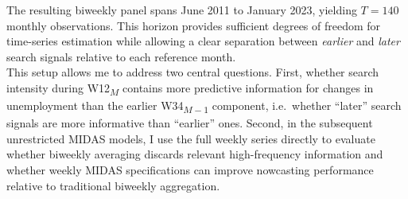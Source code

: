 \documentclass[12pt,a4paper]{article}
\begin{document}
The resulting biweekly panel spans June 2011 to January 2023, yielding $T = 140$ monthly observations. This horizon provides sufficient degrees of freedom for time-series estimation while allowing a clear separation between \emph{earlier} and \emph{later} search signals relative to each reference month. \\
This setup allows me to address two central questions. First, whether search intensity during W12\textsubscript{$M$} contains more predictive information for changes in unemployment than the earlier W34\textsubscript{$M-1$} component, i.e.\ whether “later” search signals are more informative than “earlier” ones. Second, in the subsequent unrestricted MIDAS models, I use the full weekly series directly to evaluate whether biweekly averaging discards relevant high-frequency information and whether weekly MIDAS specifications can improve nowcasting performance relative to traditional biweekly aggregation.
\end{document}
